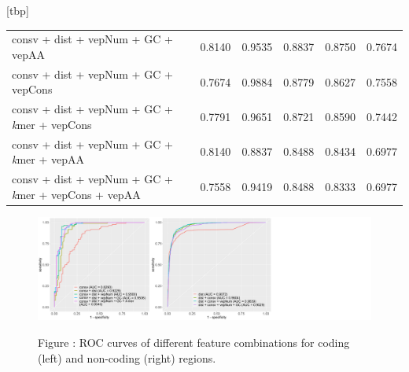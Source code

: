 \documentclass[a4paper,nohyper,nobib,openany,justified]{tufte-book}
\makeatletter
\renewenvironment{table}[1][htbp]{%
  \@tufte@orig@float{table}[#1]%
}{%
  \@tufte@orig@endfloat
}
\makeatother
\begin{document}
\begin{fullwidth}
\begin{table}[tbp]
\begin{center}
\begin{tabular}{p{6.5cm} rrrrr}
    consv + dist + vepNum + GC + vepAA                  & 0.8140 & 0.9535 & 0.8837 & 0.8750 & 0.7674 \\
    consv + dist + vepNum + GC + vepCons                & 0.7674 & 0.9884 & 0.8779 & 0.8627 & 0.7558 \\\midrule
    consv + dist + vepNum + GC + \emph{k}mer + vepCons         & 0.7791 & 0.9651 & 0.8721 & 0.8590 & 0.7442 \\
    consv + dist + vepNum + GC + \emph{k}mer + vepAA           & 0.8140 & 0.8837 & 0.8488 & 0.8434 & 0.6977 \\\midrule
    consv + dist + vepNum + GC + \emph{k}mer + vepCons + vepAA & 0.7558 & 0.9419 & 0.8488 & 0.8333 & 0.6977 \\
      \bottomrule
    \end{tabular}
  \end{center}
  \caption{Performance of different feature combinations for coding regions. Random forest classifier is built using training and validation set, and parameters are fine-tuned using 10-fold CV.\\
  $^1$conservation score; $^2$distance score; $^3$\emph{k}-mer counts; $^4$G + C content.}
  \label{tab:FeaComb_CD}
\end{table}

\begin{figure}[t]
  \includegraphics[width=\linewidth]{ROC_FeaComb.pdf}%

  \smallskip\noindent\small Figure \thefigure:
  ROC curves of different feature combinations for coding (left) and non-coding (right) regions.
  \label{fig:ROC_feaComb}%
\end{figure}


\end{fullwidth}
\end{document}
